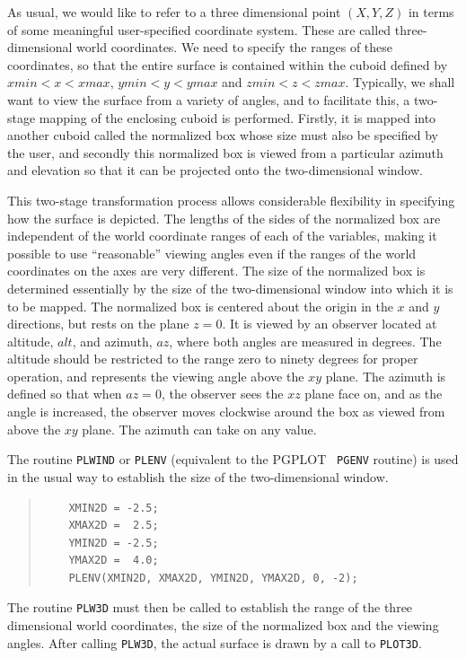 \documentclass[twoside,11pt]{article}
\begin{document}
As usual, we would like to refer to a three dimensional point $(X, Y,
Z)$ in terms of some meaningful user-specified coordinate system.
These are called three-dimensional world coordinates. We need to
specify the ranges of these coordinates, so that the entire surface is
contained within the cuboid defined by $xmin<x<xmax$, $ymin<y<ymax$
and $zmin<z<zmax$. Typically, we shall want to view the surface from a
variety of angles, and to facilitate this, a two-stage mapping of the
enclosing cuboid is performed. Firstly, it is mapped into another
cuboid called the normalized box whose size must also be specified by
the user, and secondly this normalized box is viewed from a particular
azimuth and elevation so that it can be projected onto the
two-dimensional window.

This two-stage transformation process allows considerable flexibility
in specifying how the surface is depicted. The lengths of the sides of
the normalized box are independent of the world coordinate ranges of
each of the variables, making it possible to use ``reasonable''
viewing angles even if the ranges of the world coordinates on the axes
are very different. The size of the normalized box is determined
essentially by the size of the two-dimensional window into which it is
to be mapped. The normalized box is centered about the origin in the
$x$ and $y$ directions, but rests on the plane $z = 0$. It is viewed
by an observer located at altitude, $alt$, and azimuth, $az$, where
both angles are measured in degrees. The altitude should be restricted
to the range zero to ninety degrees for proper operation, and
represents the viewing angle above the $xy$ plane. The azimuth is
defined so that when $az = 0$, the observer sees the $xz$ plane face
on, and as the angle is increased, the observer moves clockwise around
the box as viewed from above the $xy$ plane. The azimuth can take on
any value.

The routine {\tt PLWIND} or {\tt PLENV} (equivalent to the PGPLOT {\tt
PGENV} routine) is used in the usual way to establish the size of the
two-dimensional window.

\small
\begin{quote}
\begin{verbatim}
    XMIN2D = -2.5;
    XMAX2D =  2.5;
    YMIN2D = -2.5;
    YMAX2D =  4.0;
    PLENV(XMIN2D, XMAX2D, YMIN2D, YMAX2D, 0, -2);
\end{verbatim}
\end{quote}
\normalsize

The routine {\tt PLW3D} must then be called to establish the range of
the three dimensional world coordinates, the size of the normalized
box and the viewing angles. After calling {\tt PLW3D}, the actual
surface is drawn by a call to {\tt PLOT3D}.
\end{document}
